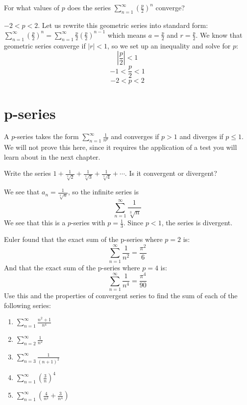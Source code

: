 \begin{Exercise}[label = geo3]
For what values of $p$ does the series $\sum_{n = 1}^\infty \left( \frac{p}{2} 
\right) ^ n$ converge?
\end{Exercise}

\begin{Answer}[ref = geo3]
$-2 < p < 2$. Let us rewrite this geometric series into standard form: $\sum_{n 
= 1}^\infty \left( \frac{p}{2} \right) ^ n = \sum_{n = 1}^\infty \frac{p}{2} 
\left( \frac{p}{2} \right) ^ {n-1}$ which means $a = \frac{p}{2}$ and $r = 
\frac{p}{2}$. We know that geometric series converge if $\left| r \right| < 
1$, so we set up an inequality and solve for $p$:
$$\left| \frac{p}{2} \right| < 1$$
$$-1 < \frac{p}{2} < 1$$
$$-2 < p < 2$$
\end{Answer}

\section{p-series}
A $p$-series takes the form $\sum_{n=1}^\infty \frac{1}{n^p}$ and converges 
if $p > 1$ and diverges if $p \leq 1$. We will not prove this here, since it 
requires the application of a test you will learn about in the next chapter. 

\begin{Worked}
\begin{Problem}
Write the series $1 + \frac{1}{\sqrt[3]{2}} + \frac{1}{
\sqrt[3]{3}} + \frac{1}{\sqrt[3]{4}} + \cdots$. Is it convergent or divergent?
\end{Problem}
\begin{Solution}
We see that $a_n = \frac{1}{\sqrt[3]{n}}$, so the 
infinite series is $$\sum_{n=1}^\infty \frac{1}{\sqrt[3]{n}}$$ 
We see that this is a $p$-series with $p = \frac{1}{3}$. Since $p < 1$, the 
series is divergent. 
\end{Solution}
\end{Worked}

\begin{Exercise}[label = euler1_series]
Euler found that the exact sum of the p-series where $p=2$ is:
$$\sum_{n=1}^\infty \frac{1}{n^2} = \frac{\pi^2}{6}$$
And that the exact sum of the p-series where $p=4$ is:
$$\sum_{n=1}^\infty \frac{1}{n^4} = \frac{\pi^4}{90}$$
Use this and the properties of convergent series to find the sum of each of 
the following series:
\begin{enumerate}
\item $\sum_{n=1}^\infty \frac{n^2 + 1}{n^4}$
\item $\sum_{n=2}^\infty \frac{1}{n^2}$
\item $\sum_{n=3}^\infty \frac{1}{(n + 1)^2}$
\item $\sum_{n=1}^\infty \left( \frac{3}{n} \right)^4$
\item $\sum_{n=1}^\infty \left( \frac{4}{n^2} + \frac{3}{n^4} \right)$
\end{enumerate}
\vspace{50mm}
\end{Exercise}

